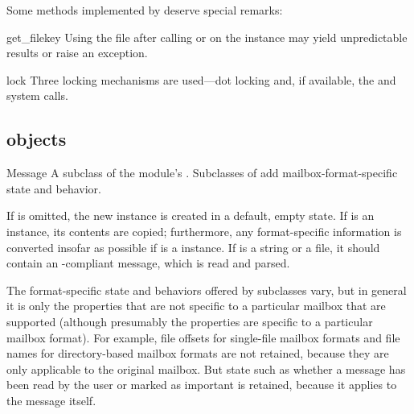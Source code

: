 Some  methods implemented by  deserve special
remarks:

\begin{methoddesc}{get_file}{key}
Using the file after calling  or  on the
 instance may yield unpredictable results or raise an exception.
\end{methoddesc}

\begin{methoddesc}{lock}{}
Three locking mechanisms are used---dot locking and, if available, the
 and  system calls.
\end{methoddesc}

\begin{seealso}
\end{seealso}

\subsection{ objects}
\label{mailbox-message-objects}

\begin{classdesc}{Message}{}
A subclass of the  module's . Subclasses
of  add mailbox-format-specific state and behavior.

If  is omitted, the new instance is created in a default, empty
state. If  is an  instance, its
contents are copied; furthermore, any format-specific information is converted
insofar as possible if  is a  instance. If
 is a string or a file, it should contain an -compliant
message, which is read and parsed.
\end{classdesc}

The format-specific state and behaviors offered by subclasses vary, but in
general it is only the properties that are not specific to a particular mailbox
that are supported (although presumably the properties are specific to a
particular mailbox format). For example, file offsets for single-file mailbox
formats and file names for directory-based mailbox formats are not retained,
because they are only applicable to the original mailbox. But state such as
whether a message has been read by the user or marked as important is retained,
because it applies to the message itself.

